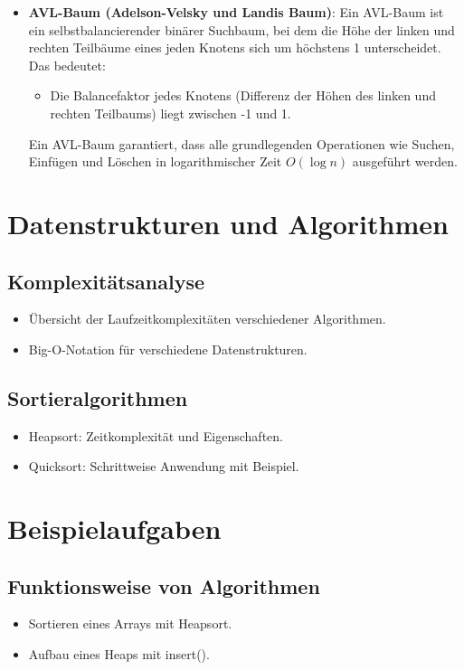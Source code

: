 \documentclass[a4paper,12pt]{article}
\begin{document}
\begin{itemize}
    \item \textbf{AVL-Baum (Adelson-Velsky und Landis Baum)}:
    Ein AVL-Baum ist ein selbstbalancierender binärer Suchbaum, bei dem die Höhe der linken und rechten Teilbäume eines jeden Knotens sich um höchstens 1 unterscheidet. Das bedeutet:
    \begin{itemize}
        \item Die Balancefaktor jedes Knotens (Differenz der Höhen des linken und rechten Teilbaums) liegt zwischen -1 und 1.
    \end{itemize}
    Ein AVL-Baum garantiert, dass alle grundlegenden Operationen wie Suchen, Einfügen und Löschen in logarithmischer Zeit \( O(\log n) \) ausgeführt werden.
\end{itemize}


\section{Datenstrukturen und Algorithmen}
\subsection{Komplexitätsanalyse}
\begin{itemize}
    \item Übersicht der Laufzeitkomplexitäten verschiedener Algorithmen.
    \item Big-O-Notation für verschiedene Datenstrukturen.
\end{itemize}

\subsection{Sortieralgorithmen}
\begin{itemize}
    \item Heapsort: Zeitkomplexität und Eigenschaften.
    \item Quicksort: Schrittweise Anwendung mit Beispiel.
\end{itemize}

\section{Beispielaufgaben}
\subsection{Funktionsweise von Algorithmen}
\begin{itemize}
    \item Sortieren eines Arrays mit Heapsort.
    \item Aufbau eines Heaps mit insert().
\end{itemize}
\end{document}
